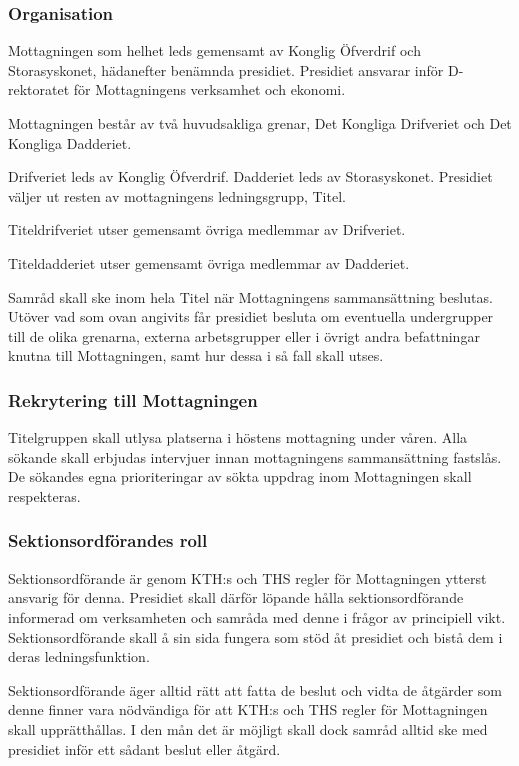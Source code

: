 \documentclass{dgovdoc}
\begin{document}
\subsubsection{Organisation}

Mottagningen som helhet leds gemensamt av Konglig Öfverdrif och Storasyskonet,
hädanefter benämnda presidiet. Presidiet ansvarar inför D-rektoratet för
Mottagningens verksamhet och ekonomi.

Mottagningen består av två huvudsakliga grenar, Det Kongliga Drifveriet och Det
Kongliga Dadderiet.

Drifveriet leds av Konglig Öfverdrif. Dadderiet leds av Storasyskonet.
Presidiet väljer ut resten av mottagningens ledningsgrupp, Titel.

Titeldrifveriet utser gemensamt övriga medlemmar av Drifveriet.

Titeldadderiet utser gemensamt övriga medlemmar av Dadderiet.

Samråd skall ske inom hela Titel när Mottagningens sammansättning beslutas.
Utöver vad som ovan angivits får presidiet besluta om eventuella undergrupper
till de olika grenarna, externa arbetsgrupper eller i övrigt andra befattningar
knutna till Mottagningen, samt hur dessa i så fall skall utses.

\subsubsection{Rekrytering till Mottagningen}

Titelgruppen skall utlysa platserna i höstens mottagning under våren. Alla
sökande skall erbjudas intervjuer innan mottagningens sammansättning fastslås.
De sökandes egna prioriteringar av sökta uppdrag inom Mottagningen skall
respekteras.

\subsubsection{Sektionsordförandes roll}

Sektionsordförande är genom KTH:s och THS regler för Mottagningen ytterst
ansvarig för denna. Presidiet skall därför löpande hålla sektionsordförande
informerad om verksamheten och samråda med denne i frågor av principiell vikt.
Sektionsordförande skall å sin sida fungera som stöd åt presidiet och bistå dem
i deras ledningsfunktion.

Sektionsordförande äger alltid rätt att fatta de beslut och vidta de åtgärder
som denne finner vara nödvändiga för att KTH:s och THS regler för Mottagningen
skall upprätthållas. I den mån det är möjligt skall dock samråd alltid ske med
presidiet inför ett sådant beslut eller åtgärd.
\end{document}
